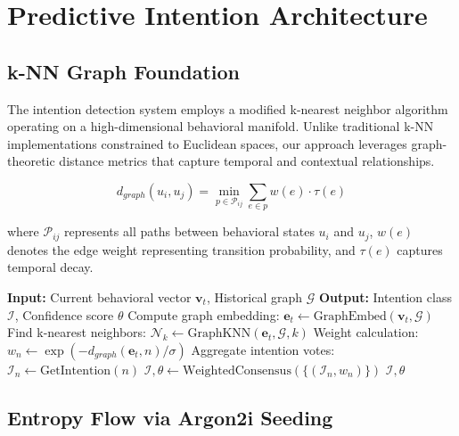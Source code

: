 \documentclass[11pt,a4paper]{article}
\begin{document}
\section{Predictive Intention Architecture}

\subsection{k-NN Graph Foundation}

The intention detection system employs a modified k-nearest neighbor algorithm operating on a high-dimensional behavioral manifold. Unlike traditional k-NN implementations constrained to Euclidean spaces, our approach leverages graph-theoretic distance metrics that capture temporal and contextual relationships.

\begin{equation}
d_{graph}(u_i, u_j) = \min_{p \in \mathcal{P}_{ij}} \sum_{e \in p} w(e) \cdot \tau(e)
\end{equation}

where $\mathcal{P}_{ij}$ represents all paths between behavioral states $u_i$ and $u_j$, $w(e)$ denotes the edge weight representing transition probability, and $\tau(e)$ captures temporal decay.

\begin{algorithm}
\caption{Intention State Detection via Graph k-NN}
\begin{algorithmic}[1]
\STATE \textbf{Input:} Current behavioral vector $\mathbf{v}_t$, Historical graph $\mathcal{G}$
\STATE \textbf{Output:} Intention class $\mathcal{I}$, Confidence score $\theta$
\STATE Compute graph embedding: $\mathbf{e}_t \leftarrow \text{GraphEmbed}(\mathbf{v}_t, \mathcal{G})$
\STATE Find k-nearest neighbors: $\mathcal{N}_k \leftarrow \text{GraphKNN}(\mathbf{e}_t, \mathcal{G}, k)$
    \STATE Weight calculation: $w_n \leftarrow \exp(-d_{graph}(\mathbf{e}_t, n) / \sigma)$
    \STATE Aggregate intention votes: $\mathcal{I}_n \leftarrow \text{GetIntention}(n)$
\ENDFOR
\STATE $\mathcal{I}, \theta \leftarrow \text{WeightedConsensus}(\{(\mathcal{I}_n, w_n)\})$
\RETURN $\mathcal{I}, \theta$
\end{algorithmic}
\end{algorithm}

\subsection{Entropy Flow via Argon2i Seeding}
\end{document}
